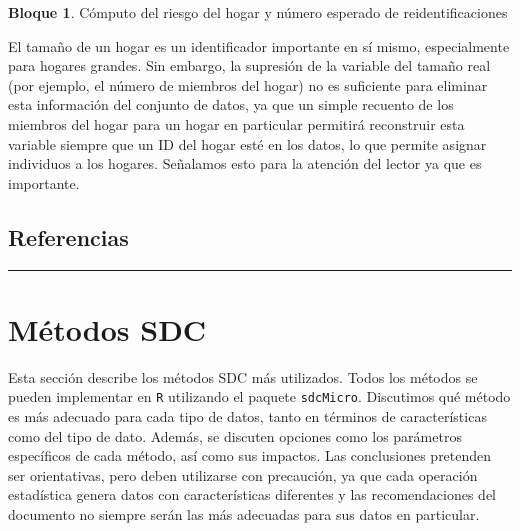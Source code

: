 \documentclass[]{book}
\newenvironment{Shaded}{\begin{snugshade}}{\end{snugshade}}
\newcommand{\CommentTok}[1]{\textcolor[rgb]{0.56,0.35,0.01}{\textit{#1}}}
\newcommand{\NormalTok}[1]{#1}
\newcommand{\OperatorTok}[1]{\textcolor[rgb]{0.81,0.36,0.00}{\textbf{#1}}}
\theoremstyle{definition}
\theoremstyle{definition}
\newtheorem{example}{Bloque}[chapter]
\theoremstyle{definition}
\theoremstyle{definition}
\theoremstyle{remark}
\begin{document}
\begin{example}
\protect\hypertarget{exm:bloqueMR12}{}{\label{exm:bloqueMR12} }Cómputo del riesgo del hogar y número esperado de reidentificaciones
\end{example}

\begin{Shaded}
\end{Shaded}

El tamaño de un hogar es un identificador importante en sí mismo, especialmente para hogares grandes. Sin embargo, la supresión de la variable del tamaño real (por ejemplo, el número de miembros del hogar) no es suficiente para eliminar esta información del conjunto de datos, ya que un simple recuento de los miembros del hogar para un hogar en particular permitirá reconstruir esta variable siempre que un ID del hogar esté en los datos, lo que permite asignar individuos a los hogares. Señalamos esto para la atención del lector ya que es importante.

\hypertarget{referencias}{%
\section{Referencias}\label{referencias}}

\begin{center}\rule{0.5\linewidth}{0.5pt}\end{center}

\hypertarget{muxe9todos-sdc}{%
\chapter{Métodos SDC}\label{muxe9todos-sdc}}

Esta sección describe los métodos SDC más utilizados. Todos los métodos se pueden implementar en \texttt{R} utilizando el paquete \texttt{sdcMicro}. Discutimos qué método es más adecuado para cada tipo de datos, tanto en términos de características como del tipo de dato. Además, se discuten opciones como los parámetros específicos de cada método, así como sus impactos. Las conclusiones pretenden ser orientativas, pero deben utilizarse con precaución, ya que cada operación estadística genera datos con características diferentes y las recomendaciones del documento no siempre serán las más adecuadas para sus datos en particular.
\end{document}
